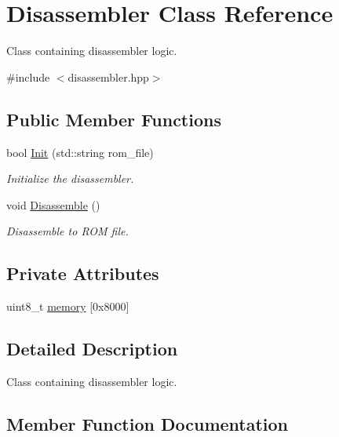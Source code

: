 \hypertarget{classDisassembler}{}\section{Disassembler Class Reference}
\label{classDisassembler}


Class containing disassembler logic.  




{\ttfamily \#include $<$disassembler.\+hpp$>$}

\subsection*{Public Member Functions}
\begin{DoxyCompactItemize}
\item 
bool \mbox{\hyperlink{classDisassembler_a569452759a1a0ae0ca52c0bb0d451c46}{Init}} (std\+::string rom\+\_\+file)
\begin{DoxyCompactList}\small\item\em Initialize the disassembler. \end{DoxyCompactList}\item 
\mbox{\label{classDisassembler_a7dbc8f55be4a05749bf94a93d3e44d85}} 
void \mbox{\hyperlink{classDisassembler_a7dbc8f55be4a05749bf94a93d3e44d85}{Disassemble}} ()
\begin{DoxyCompactList}\small\item\em Disassemble to R\+OM file. \end{DoxyCompactList}\end{DoxyCompactItemize}
\subsection*{Private Attributes}
\begin{DoxyCompactItemize}
\item 
uint8\+\_\+t \mbox{\hyperlink{classDisassembler_a190fc196a73e182f4d9b8292290196c0}{memory}} \mbox{[}0x8000\mbox{]}
\end{DoxyCompactItemize}


\subsection{Detailed Description}
Class containing disassembler logic. 

\subsection{Member Function Documentation}
\mbox{\label{classDisassembler_a569452759a1a0ae0ca52c0bb0d451c46}} 
